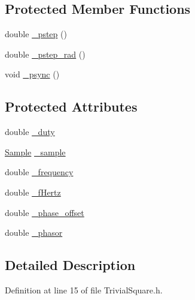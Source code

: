 \subsection*{Protected Member Functions}
\begin{DoxyCompactItemize}
\item 
double \hyperlink{classSignal_1_1SignalGenerator_a43b0eec84ee7df04c947533c0511c2c0}{\+\_\+pstep} ()
\item 
double \hyperlink{classSignal_1_1SignalGenerator_abf2f4ab977c6e84bf85022eab8135304}{\+\_\+pstep\+\_\+rad} ()
\item 
void \hyperlink{classSignal_1_1SignalGenerator_a563f57d4dfd8728a6a572f15c1e2532b}{\+\_\+psync} ()
\end{DoxyCompactItemize}
\subsection*{Protected Attributes}
\begin{DoxyCompactItemize}
\item 
double \hyperlink{classSignal_1_1Trivial_1_1Square_aa1eef76b9a4cd2e255f19f11d44db4f5}{\+\_\+duty}
\item 
\hyperlink{classSignal_1_1Sample}{Sample} \hyperlink{classSignal_1_1Trivial_1_1TrivialGenerator_a2e43e1ae605338b92e48974a681866e9}{\+\_\+sample}
\item 
double \hyperlink{classSignal_1_1SignalGenerator_a7f107461333bce68c5dad412db96a8c2}{\+\_\+frequency}
\item 
double \hyperlink{classSignal_1_1SignalGenerator_a85a4702347352bab1c71e0a8df8437d6}{\+\_\+f\+Hertz}
\item 
double \hyperlink{classSignal_1_1SignalGenerator_a6b4444d46747c8517171edbbf4b5588f}{\+\_\+phase\+\_\+offset}
\item 
double \hyperlink{classSignal_1_1SignalGenerator_af4aa0728ded00777be26a06d883eaeb3}{\+\_\+phasor}
\end{DoxyCompactItemize}


\subsection{Detailed Description}


Definition at line 15 of file Trivial\+Square.\+h.



